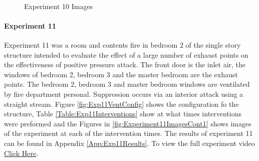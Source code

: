 \documentclass{article}
\begin{document}
\begin{figure}[H]
	\ContinuedFloat 
	\centering 
	 \ 
	 \ 
	\caption{Experiment 10 Images}
	\label{fig:Experiment10ImagesCont3} 
\end{figure}

\paragraph{Experiment 11}\mbox{}

Experiment 11 was a room and contents fire in bedroom 2 of the single story structure intended to evaluate the effect of a large number of exhaust points on the effectiveness of positive pressure attack. The front door is the inlet air, the windows of bedroom 2, bedroom 3 and the master bedroom are the exhaust points. The bedroom 2, bedroom 3 and master bedroom windows are ventilated by fire department personal. Suppression occurs via an interior attack using a straight stream. Figure \ref{fig:Exp11VentConfig} shows the configuration fo the structure, Table \ref{Table:Exp11Interventions} show at what times interventions were preformed and the Figures in \ref{fig:Experiment11ImagesCont1} shows images of the experiment at each of the intervention times. The results of experiment 11 can be found in Appendix \ref{App:Exp11Results}. To view the full experiment video \href{https://youtu.be/XlgvKuJ40kU}{Click Here}.
\end{document}
